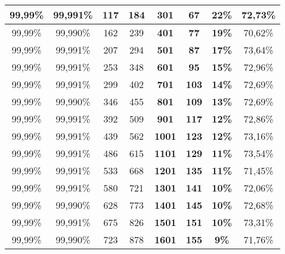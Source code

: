 \begin{table}[H]
{\begin{tabular}{cccc
>{\columncolor[HTML]{8D3CE1}}c 
>{\columncolor[HTML]{5754D6}}c 
>{\columncolor[HTML]{8FFFFB}}c c}
99,99\% & 99,991\% & 117 & 184 & \textbf{301} & \textbf{67} & \textbf{22\%} & 72,73\% \\ \hline
\cellcolor[HTML]{C0C0C0}99,99\% & \cellcolor[HTML]{C0C0C0}99,990\% & \cellcolor[HTML]{C0C0C0}162 & \cellcolor[HTML]{C0C0C0}239 & \textbf{401} & \textbf{77} & \textbf{19\%} & \cellcolor[HTML]{C0C0C0}70,62\% \\ \hline
99,99\% & 99,991\% & 207 & 294 & \textbf{501} & \textbf{87} & \textbf{17\%} & 73,64\% \\ \hline
\cellcolor[HTML]{C0C0C0}99,99\% & \cellcolor[HTML]{C0C0C0}99,991\% & \cellcolor[HTML]{C0C0C0}253 & \cellcolor[HTML]{C0C0C0}348 & \textbf{601} & \textbf{95} & \textbf{15\%} & \cellcolor[HTML]{C0C0C0}72,96\% \\ \hline
99,99\% & 99,991\% & 299 & 402 & \textbf{701} & \textbf{103} & \textbf{14\%} & 72,69\% \\ \hline
\cellcolor[HTML]{C0C0C0}99,99\% & \cellcolor[HTML]{C0C0C0}99,990\% & \cellcolor[HTML]{C0C0C0}346 & \cellcolor[HTML]{C0C0C0}455 & \textbf{801} & \textbf{109} & \textbf{13\%} & \cellcolor[HTML]{C0C0C0}72,69\% \\ \hline
99,99\% & 99,991\% & 392 & 509 & \textbf{901} & \textbf{117} & \textbf{12\%} & 72,86\% \\ \hline
\cellcolor[HTML]{C0C0C0}99,99\% & \cellcolor[HTML]{C0C0C0}99,991\% & \cellcolor[HTML]{C0C0C0}439 & \cellcolor[HTML]{C0C0C0}562 & \textbf{1001} & \textbf{123} & \textbf{12\%} & \cellcolor[HTML]{C0C0C0}73,16\% \\ \hline
99,99\% & 99,991\% & 486 & 615 & \textbf{1101} & \textbf{129} & \textbf{11\%} & 73,54\% \\ \hline
\cellcolor[HTML]{C0C0C0}99,99\% & \cellcolor[HTML]{C0C0C0}99,991\% & \cellcolor[HTML]{C0C0C0}533 & \cellcolor[HTML]{C0C0C0}668 & \textbf{1201} & \textbf{135} & \textbf{11\%} & \cellcolor[HTML]{C0C0C0}71,45\% \\ \hline
99,99\% & 99,991\% & 580 & 721 & \textbf{1301} & \textbf{141} & \textbf{10\%} & 72,06\% \\ \hline
\cellcolor[HTML]{C0C0C0}99,99\% & \cellcolor[HTML]{C0C0C0}99,990\% & \cellcolor[HTML]{C0C0C0}628 & \cellcolor[HTML]{C0C0C0}773 & \textbf{1401} & \textbf{145} & \textbf{10\%} & \cellcolor[HTML]{C0C0C0}72,68\% \\ \hline
99,99\% & 99,991\% & 675 & 826 & \textbf{1501} & \textbf{151} & \textbf{10\%} & 73,31\% \\ \hline
\cellcolor[HTML]{C0C0C0}99,99\% & \cellcolor[HTML]{C0C0C0}99,990\% & \cellcolor[HTML]{C0C0C0}723 & \cellcolor[HTML]{C0C0C0}878 & \textbf{1601} & \textbf{155} & \textbf{9\%} & \cellcolor[HTML]{C0C0C0}71,76\% \\ \hline

\end{tabular}}
\end{table}
